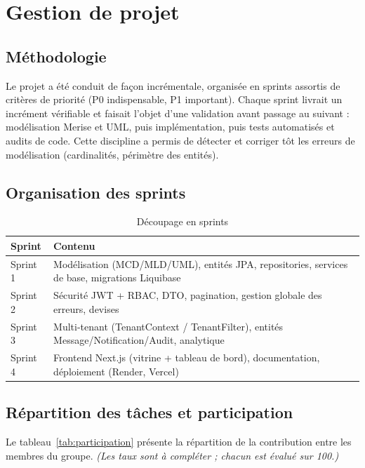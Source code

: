 \chapter{Gestion de projet}
\label{chap:gestion}

\iffalse
\section{Méthodologie}

Le projet a été conduit de façon incrémentale, organisée en sprints assortis de critères de
priorité (P0 indispensable, P1 important). Chaque sprint livrait un incrément vérifiable et
faisait l'objet d'une validation avant passage au suivant : modélisation Merise et UML,
puis implémentation, puis tests automatisés et audits de code. Cette discipline a permis de
détecter et corriger tôt les erreurs de modélisation (cardinalités, périmètre des entités).

\section{Organisation des sprints}

\begin{table}[H]
\centering
\caption{Découpage en sprints}
\label{tab:sprints}
\renewcommand{\arraystretch}{1.25}\footnotesize
\begin{tabularx}{\linewidth}{L{2.4cm} X}
\toprule
\textbf{Sprint} & \textbf{Contenu} \\
\midrule
Sprint 1 & Modélisation (MCD/MLD/UML), entités JPA, repositories, services de base, migrations Liquibase \\
Sprint 2 & Sécurité JWT + RBAC, DTO, pagination, gestion globale des erreurs, devises \\
Sprint 3 & Multi-tenant (TenantContext / TenantFilter), entités Message/Notification/Audit, analytique \\
Sprint 4 & Frontend Next.js (vitrine + tableau de bord), documentation, déploiement (Render, Vercel) \\
\bottomrule
\end{tabularx}
\end{table}

\section{Répartition des tâches et participation}

Le tableau~\ref{tab:participation} présente la répartition de la contribution entre les
membres du groupe. \emph{(Les taux sont à compléter ; chacun est évalué sur 100.)}

